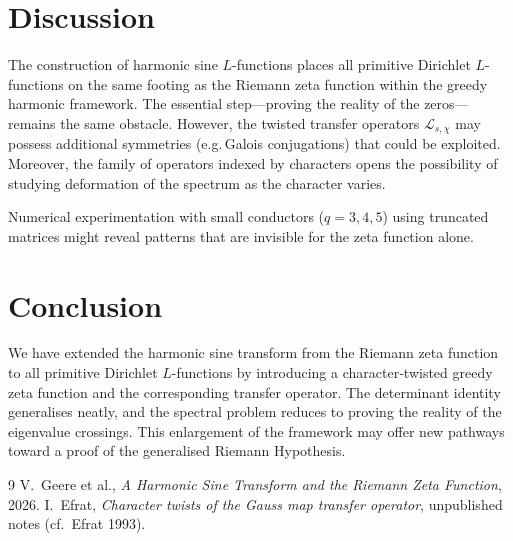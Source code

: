\documentclass[11pt,a4paper]{article}
\begin{document}
\section{Discussion}
The construction of harmonic sine \(L\)-functions places all primitive Dirichlet \(L\)-functions on the same footing as the Riemann zeta function within the greedy harmonic framework.  The essential step—proving the reality of the zeros—remains the same obstacle.  However, the twisted transfer operators \(\mathcal{L}_{s,\chi}\) may possess additional symmetries (e.g. Galois conjugations) that could be exploited.  Moreover, the family of operators indexed by characters opens the possibility of studying deformation of the spectrum as the character varies.

Numerical experimentation with small conductors (\(q=3,4,5\)) using truncated matrices might reveal patterns that are invisible for the zeta function alone.

\section{Conclusion}
We have extended the harmonic sine transform from the Riemann zeta function to all primitive Dirichlet \(L\)-functions by introducing a character‑twisted greedy zeta function and the corresponding transfer operator.  The determinant identity generalises neatly, and the spectral problem reduces to proving the reality of the eigenvalue crossings.  This enlargement of the framework may offer new pathways toward a proof of the generalised Riemann Hypothesis.

\begin{thebibliography}{9}
V.~Geere et al., \emph{A Harmonic Sine Transform and the Riemann Zeta Function}, 2026.
I.~Efrat, \emph{Character twists of the Gauss map transfer operator}, unpublished notes (cf.~Efrat 1993).
\end{thebibliography}
\end{document}
